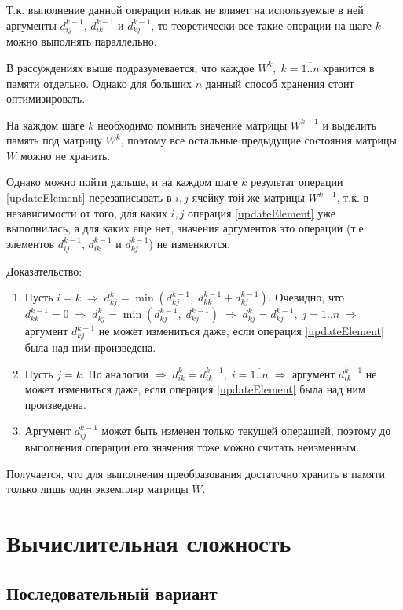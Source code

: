 \documentclass{article}
\begin{document}
	Т.к. выполнение данной операции никак не влияет на используемые в ней аргументы $d_{i j}^{k-1}$, $d_{i k}^{k-1}$ и $d_{k j}^{k-1}$, то теоретически все такие операции на шаге $k$ можно выполнять параллельно.
	
	В рассуждениях выше подразумевается, что каждое $W^k,\; k=\overline{1..n}$ хранится в памяти отдельно. Однако для больших $n$ данный способ хранения стоит оптимизировать. 
	
	На каждом шаге $k$ необходимо помнить значение матрицы $W^{k-1}$ и выделить память под матрицу $W^{k}$, поэтому все остальные предыдущие состояния матрицы $W$ можно не хранить.

	Однако можно пойти дальше, и на каждом шаге $k$ результат операции \ref{updateElement} перезаписывать в $i,j$-ячейку той же матрицы $W^{k-1}$, т.к. в независимости от того, для каких $i,j$ операция \ref{updateElement} уже выполнилась, а для каких еще нет, значения аргументов это операции (т.е. элементов $d_{i j}^{k-1}$, $d_{i k}^{k-1}$ и $d_{k j}^{k-1}$) не изменяются.
	
	Доказательство: 
	\begin{enumerate}
		\item Пусть $i=k\; \Rightarrow\; d_{k j}^{k} = \min (d_{k j}^{k-1},\; d_{k k}^{k-1} + d_{k j}^{k-1})$. Очевидно, что $d_{k k}^{k-1}=0 \; \Rightarrow \; d_{k j}^{k} = \min (d_{k j}^{k-1},\; d_{k j}^{k-1}) \; \Rightarrow \; d_{k j}^{k} = d_{k j}^{k-1}, \; j=\overline{1..n} \;  \Rightarrow $ аргумент $d_{k j}^{k-1}$ не может измениться даже, если операция \ref{updateElement} была над ним произведена.
		\item Пусть $j=k$. По аналогии $\Rightarrow \; d_{i k}^{k} = d_{i k}^{k-1}, \; i=\overline{1..n} \;  \Rightarrow $ аргумент $d_{i k}^{k-1}$ не может измениться даже, если операция \ref{updateElement} была над ним произведена.
		\item Аргумент $d_{i j}^{k-1}$ может быть изменен только текущей операцией, поэтому до выполнения операции его значения тоже можно считать неизменным.
	\end{enumerate}
	
	Получается, что для выполнения преобразования достаточно хранить в памяти только лишь один экземпляр матрицы $W$. 
	
	
\section{Вычислительная сложность}
	
	\subsection{Последовательный вариант} \label{consistentWay}
	
\end{document}
